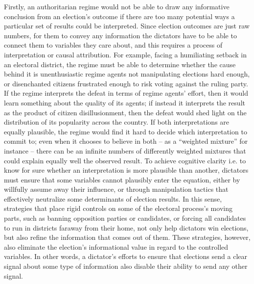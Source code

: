 \documentclass[12pt]{article}
\newcommand{\1}{\mathbbm{1}}
\begin{document}
Firstly, an authoritarian regime would not be able to draw any informative conclusion from an election's outcome if there are too many potential ways a particular set of results could be interpreted. Since election outcomes are just raw numbers, for them to convey any information the dictators have to be able to connect them to variables they care about, and this requires a process of interpretation or causal attribution. For example, facing a humiliating setback in an electoral district, the regime must be able to determine whether the cause behind it is unenthusiastic regime agents not manipulating elections hard enough, or disenchanted citizens frustrated enough to risk voting against the ruling party. If the regime interprets the defeat in terms of regime agents' effort, then it would learn something about the quality of its agents; if instead it interprets the result as the product of citizen disillusionment, then the defeat would shed light on the distribution of its popularity across the country. If both interpretations are equally plausible, the regime would find it hard to decide which interpretation to commit to; even when it chooses to believe in both -- as a ``weighted mixture'' for instance -- there can be an infinite numbers of differently weighted mixtures that could explain equally well the observed result. To achieve cognitive clarity i.e. to know for sure whether an interpretation is more plausible than another, dictators must ensure that some variables cannot plausibly enter the equation, either by willfully assume away their influence, or through manipulation tactics that effectively neutralize some determinants of election results. In this sense, strategies that place rigid controls on some of the electoral process's moving parts, such as banning opposition parties or candidates, or forcing all candidates to run in districts faraway from their home, not only help dictators win elections, but also refine the information that comes out of them. These strategies, however, also eliminate the election's informational value in regard to the controlled variables. In other words, a dictator's efforts to ensure that elections send a clear signal about some type of information also disable their ability to send any other signal.
\end{document}

